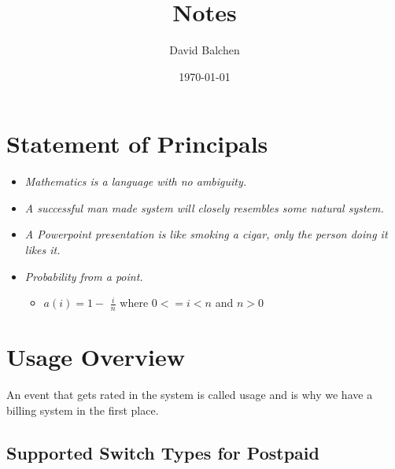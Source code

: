 \documentclass[12pt,twoside]{article}
\title{Notes}
\author{David Balchen}
\date{\today}
\begin{document}
\maketitle

\setcounter{tocdepth}{3}
\vspace*{1cm}
\pagenumbering{}
\newpage
\clearpage
\addtolength{\oddsidemargin}{-.5in}
\addtolength{\evensidemargin}{-01.25in}
\addtolength{\textwidth}{1.4in}
\addtolength{\topmargin}{-1.25in}
\addtolength{\textheight}{2.45in}
\setcounter{tocdepth}{3}
\vspace*{1cm} 
\newpage
{}
\setcounter{tocdepth}{2}
\pagestyle{fancy}
\fancyhf[C]{}
\tableofcontents 
\newpage
{}
\section{Statement of Principals}
\label{sec-1}

\begin{itemize}
\item \emph{Mathematics is a language with no ambiguity.}
\item \emph{A successful man made system will closely resembles some natural system.}
\item \emph{A Powerpoint presentation is like smoking a cigar, only the      person doing it likes it.}
\item \emph{Probability from a point.}
\begin{itemize}
\item $a(i) = 1-$ \Large $\frac{i}{n}$ \normalsize where $0 <= i < n$ and $n > 0$
\end{itemize}
\end{itemize}
\section{Usage Overview}
\label{sec-2}

  An event that gets rated in the system is called usage and is why we have a billing system in the first place.  
\subsection{Supported Switch Types for Postpaid}
\label{sec-2-1}
\end{document}
